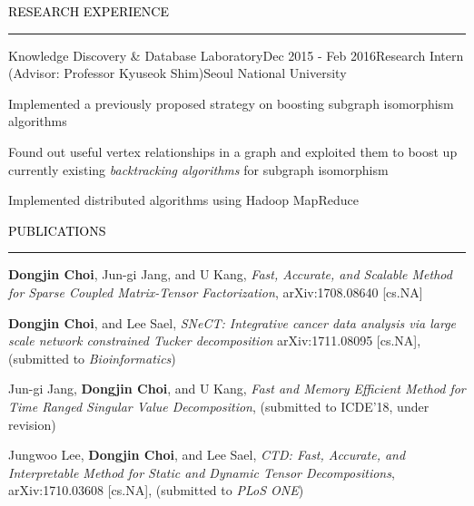 \documentclass{resume} %
\renewenvironment{rSection}[1]{
	\sectionskip
	\textcolor{Black}{\MakeUppercase{#1}}
	\sectionlineskip
	\hrule
	\begin{list}{}{
			\setlength{\leftmargin}{1.5em}
		}
		\item[]
	}{
	\end{list}
}
\begin{document}
\begin{rSection}{Research Experience}
\begin{rSubsection}{Knowledge Discovery \& Database Laboratory}{Dec 2015 - Feb 2016}{Research Intern (Advisor: Professor Kyuseok Shim)}{Seoul National University}
	\item Implemented a previously proposed strategy on boosting subgraph isomorphism algorithms
	\item Found out useful vertex relationships in a graph and exploited them to boost up currently existing \textit{backtracking algorithms} for subgraph isomorphism
	\item Implemented distributed algorithms using Hadoop MapReduce
	\vspace{1.3cm}
\end{rSubsection}

\end{rSection}



\begin{rSection}{Publications}
\begin{rSubsection}{}{}{}{}
	\vspace*{-2.5mm}
	\item \textbf{Dongjin Choi}, Jun-gi Jang, and U Kang, \textit{Fast, Accurate, and Scalable Method for Sparse Coupled Matrix-Tensor Factorization}, arXiv:1708.08640 [cs.NA]
	\vspace*{-1mm}
	
	\item \textbf{Dongjin Choi}, and Lee Sael, \textit{SNeCT: Integrative cancer data analysis via large scale network constrained Tucker decomposition} arXiv:1711.08095 [cs.NA], (submitted to \textit{Bioinformatics})
	\vspace*{-1mm}
	
	\item Jun-gi Jang, \textbf{Dongjin Choi}, and U Kang, \textit{Fast and Memory Efficient Method for Time Ranged Singular Value Decomposition}, (submitted to ICDE'18, under revision)
	\vspace*{-1mm}
	
	\item Jungwoo Lee, \textbf{Dongjin Choi}, and Lee Sael, \textit{CTD: Fast, Accurate, and Interpretable Method for Static and Dynamic Tensor Decompositions}, arXiv:1710.03608 [cs.NA], (submitted to \textit{PLoS ONE}) 
\end{rSubsection}

\end{rSection}
\vspace{-6mm}
\end{document}
